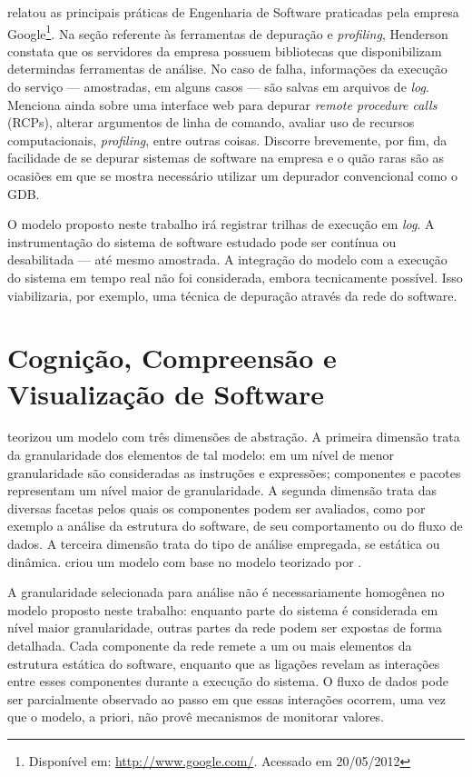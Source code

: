  relatou as principais práticas de
Engenharia de Software praticadas pela empresa Google\footnote{Disponível em:
\href{http://www.google.com/}{http://www.google.com/}. Acessado em 20/05/2012}.
Na seção referente às ferramentas de depuração e \textit{profiling}, Henderson
constata que os servidores da empresa possuem bibliotecas que disponibilizam
determindas ferramentas de análise. No caso de falha, informações da execução do
serviço --- amostradas, em alguns casos --- são salvas em arquivos de
\textit{log}. Menciona ainda sobre uma interface web para depurar 
\textit{remote procedure calls} (RCPs), alterar argumentos de linha de comando,
avaliar uso de recursos computacionais, \textit{profiling}, entre outras coisas.
Discorre brevemente, por fim, da facilidade de se depurar sistemas de software
na empresa e o quão raras são as ocasiões em que se mostra necessário utilizar
um depurador convencional como o GDB.

O modelo proposto neste trabalho irá registrar trilhas de execução em
\textit{log}. A instrumentação do sistema de software estudado pode ser
contínua ou desabilitada --- até mesmo amostrada. A integração do modelo com
a execução do sistema em tempo real não foi considerada, embora tecnicamente
possível. Isso viabilizaria, por exemplo, uma técnica de depuração através da
rede do software.

\section{Cognição, Compreensão e Visualização de Software}
\label{sec:SoftwareCognition}

 teorizou um modelo com três dimensões de
abstração.
A primeira dimensão trata da granularidade dos elementos de tal
modelo: em um nível de menor granularidade são consideradas as instruções e
expressões; componentes e pacotes representam um nível maior de granularidade.
A segunda dimensão trata das diversas facetas pelos quais os componentes podem
ser avaliados, como por exemplo a análise da estrutura do software, de seu 
comportamento ou do fluxo de dados.
A terceira dimensão trata do tipo de análise empregada, se estática ou dinâmica.
 criou um modelo com base no modelo
teorizado por .

A granularidade selecionada para análise não é necessariamente homogênea no
modelo proposto neste trabalho: enquanto parte do sistema é considerada em nível
maior granularidade, outras partes da rede podem ser expostas de forma
detalhada. Cada componente da rede remete a um ou mais elementos da estrutura
estática do software, enquanto que as ligações revelam as interações entre esses
componentes durante a execução do sistema. O fluxo de dados pode ser
parcialmente observado ao passo em que essas interações ocorrem, uma vez que o
modelo, a priori, não provê mecanismos de monitorar valores.

